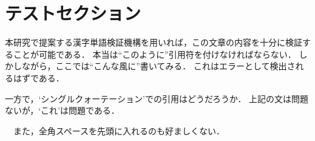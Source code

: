 \section{テストセクション}

本研究で提案する漢字単語検証機構を用いれば，この文章の内容を十分に検証することが可能である．
本当は``このように''引用符を付けなければならない．
しかしながら，ここでは“こんな風に”書いてみる．
これはエラーとして検出されるはずである．

一方で，`シングルクォーテーション'での引用はどうだろうか．
上記の文は問題ないが，‘これ’は問題である．

　また，全角スペースを先頭に入れるのも好ましくない．
